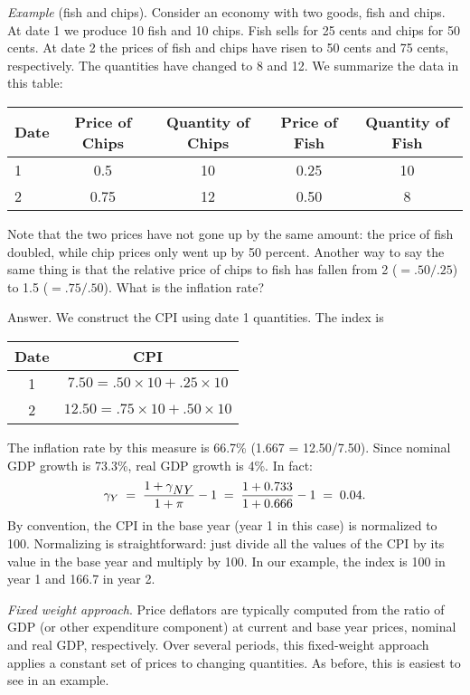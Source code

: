 \documentclass[12pt,letterpaper]{article}
\newcommand{\NY}{\mbox{\em NY\/}}
\begin{document}
{\it Example\/} (fish and chips). Consider an economy with two
goods, fish and chips. At date 1 we produce 10 fish and 10 chips.
Fish sells for 25 cents and chips for 50 cents. At date 2 the
prices of fish and chips have risen to 50 cents and 75 cents,
respectively. The quantities have changed to 8 and 12. We
summarize the data in this table:
%
\begin{center}
\begin{tabular}{lcccc} %
Date    & Price of Chips  & Quantity of Chips & Price of Fish & Quantity of Fish  \\%
\hline
 1  & 0.5             & 10                & 0.25          & 10                \\%
 2  & 0.75            & 12                & 0.50          &  8                \\%
\end{tabular}
\end{center}
%
Note that the two prices have not gone up by the same amount: the
price of fish doubled, while chip prices only went up by 50
percent. Another way to say the same thing is that the relative
price of chips to fish has fallen from 2 ($=.50/.25$) to 1.5
($=.75/.50$). What is the inflation rate?


Answer.  We construct the CPI using date 1 quantities.
The index is
%
\begin{center}
\begin{tabular}{cc} %
Date  & CPI     \\%
\hline
1     & $7.50 = .50\times 10+.25\times 10$     \\%
2     & $12.50 = .75\times 10+.50\times 10$    \\%
\end{tabular}
\end{center}
%
The inflation rate by this measure is 66.7\% (1.667 = 12.50/7.50).
Since nominal GDP growth is 73.3\%, real GDP growth is 4\%.
In fact:
%
$$
\gamma_{Y} \;=\;
\frac{1+\gamma_{\NY}}{1+\pi}-1 \;=\;
\frac{1+0.733}{1+0.666}-1 \;=\; 0.04.
$$
%
By convention, the CPI in the base year (year 1 in this case)
is normalized to 100. Normalizing is straightforward: just divide
all the values of the CPI by its value in the base year and
multiply by 100. In our example, the index is 100 in year 1 and
166.7 in year 2.

{\it Fixed weight approach\/}. %
Price deflators are typically computed from the ratio of GDP
(or other expenditure component) at current and base year prices,
nominal and real GDP, respectively. Over several periods, this
fixed-weight approach applies a constant set of prices to changing
quantities. As before, this is easiest to see in an example.
\end{document}
